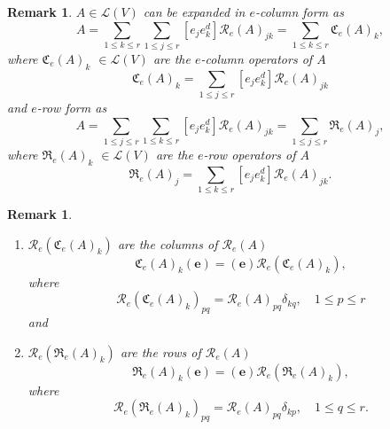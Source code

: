 \documentclass[aps,preprint]{revtex4}%
\newtheorem{remark}[theorem]{Remark}
\begin{document}
\begin{remark}
$A\in\mathcal{L}\left(  V\right)  $ can be expanded in $e$-\emph{column form}
as
\begin{equation}
A=\sum_{1\leq k\leq r}\sum_{1\leq j\leq r}\left[  e_{j}e_{k}^{d}\right]
\mathcal{R}_{e}\left(  A\right)  _{jk}=\sum_{1\leq k\leq r}\mathfrak{C}%
_{e}\left(  A\right)  _{k},
\end{equation}
where $\mathfrak{C}_{e}\left(  A\right)  _{k}$ $\in\mathcal{L}\left(
V\right)  $ are the $e$-\emph{column} operators of $A$
\begin{equation}
\mathfrak{C}_{e}\left(  A\right)  _{k}=\sum_{1\leq j\leq r}\left[  e_{j}%
e_{k}^{d}\right]  \mathcal{R}_{e}\left(  A\right)  _{jk}%
\end{equation}
and $e$-\emph{row form} as
\begin{equation}
A=\sum_{1\leq j\leq r}\sum_{1\leq k\leq r}\left[  e_{j}e_{k}^{d}\right]
\mathcal{R}_{e}\left(  A\right)  _{jk}=\sum_{1\leq j\leq r}\mathfrak{R}%
_{e}\left(  A\right)  _{j},
\end{equation}
where $\mathfrak{R}_{e}\left(  A\right)  _{k}$ $\in\mathcal{L}\left(
V\right)  $ are the $e$-\emph{row} operators of $A$
\begin{equation}
\mathfrak{R}_{e}\left(  A\right)  _{j}=\sum_{1\leq k\leq r}\left[  e_{j}%
e_{k}^{d}\right]  \mathcal{R}_{e}\left(  A\right)  _{jk}.
\end{equation}

\end{remark}

\begin{remark}
\begin{enumerate}
\item $\mathcal{R}_{e}\left(  \mathfrak{C}_{e}\left(  A\right)  _{k}\right)  $
are the columns of $\mathcal{R}_{e}\left(  A\right)  $
\begin{equation}
\mathfrak{C}_{e}\left(  A\right)  _{k}\left(  \mathbf{e}\right)  =\left(
\mathbf{e}\right)  \mathcal{R}_{e}\left(  \mathfrak{C}_{e}\left(  A\right)
_{k}\right)  ,
\end{equation}
where
\begin{equation}
\mathcal{R}_{e}\left(  \mathfrak{C}_{e}\left(  A\right)  _{k}\right)
_{pq}=\mathcal{R}_{e}\left(  A\right)  _{pq}\delta_{kq},\quad1\leq p\leq r
\end{equation}
and

\item $\mathcal{R}_{e}\left(  \mathfrak{R}_{e}\left(  A\right)  _{k}\right)  $
are the rows of $\mathcal{R}_{e}\left(  A\right)  $%
\begin{equation}
\mathfrak{R}_{e}\left(  A\right)  _{k}\left(  \mathbf{e}\right)  =\left(
\mathbf{e}\right)  \mathcal{R}_{e}\left(  \mathfrak{R}_{e}\left(  A\right)
_{k}\right)  ,
\end{equation}
where
\begin{equation}
\mathcal{R}_{e}\left(  \mathfrak{R}_{e}\left(  A\right)  _{k}\right)
_{pq}=\mathcal{R}_{e}\left(  A\right)  _{pq}\delta_{kp},\quad1\leq q\leq r.
\end{equation}

\end{enumerate}
\end{remark}
\end{document}
